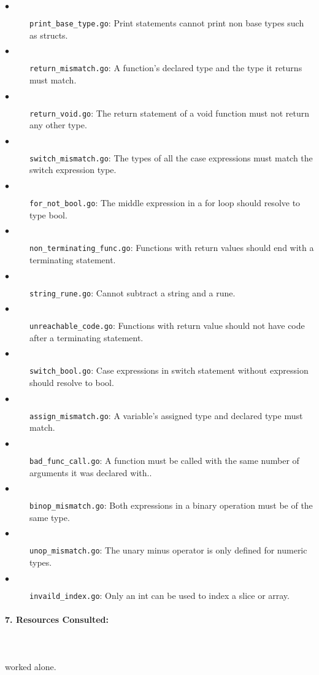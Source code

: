 \documentclass{article}
\begin{document}
\begin{description}
\item[$\bullet$] \texttt{print\_base\_type.go}: Print statements cannot print non base types such as structs.
\item[$\bullet$] \texttt{return\_mismatch.go}: A function's declared type and the type it returns must match.
\item[$\bullet$] \texttt{return\_void.go}: The return statement of a void function must not return any other type.
\item[$\bullet$] \texttt{switch\_mismatch.go}: The types of all the case expressions must match the switch expression type.
\item[$\bullet$] \texttt{for\_not\_bool.go}: The middle expression in a for loop should resolve to type bool.
\item[$\bullet$] \texttt{non\_terminating\_func.go}: Functions with return values should end with a terminating statement.
\item[$\bullet$] \texttt{string\_rune.go}: Cannot subtract a string and a rune.
\item[$\bullet$] \texttt{unreachable\_code.go}: Functions with return value should not have code after a terminating statement.
\item[$\bullet$] \texttt{switch\_bool.go}: Case expressions in switch statement without expression should resolve to bool.
\item[$\bullet$] \texttt{assign\_mismatch.go}: A variable's assigned type and declared type must match.
\item[$\bullet$] \texttt{bad\_func\_call.go}: A function must be called with the same number of arguments it was declared with..
\item[$\bullet$] \texttt{binop\_mismatch.go}: Both expressions in a binary operation must be of the same type.
\item[$\bullet$] \texttt{unop\_mismatch.go}: The unary minus operator is only defined for numeric types.
\item[$\bullet$] \texttt{invaild\_index.go}: Only an int can be used to index a slice or array.

\end{description}
\paragraph{7. Resources Consulted:}\mbox{}\\\\
 worked alone.
\end{document}
